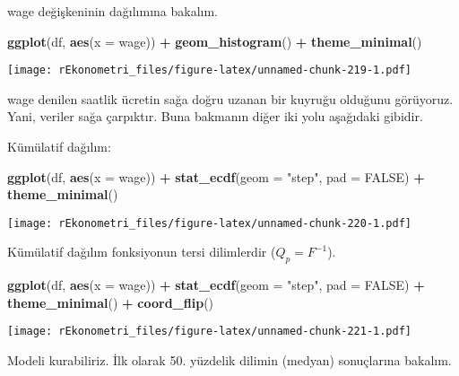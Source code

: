 \documentclass[
]{book}
\newenvironment{Shaded}{\begin{snugshade}}{\end{snugshade}}
\newcommand{\DataTypeTok}[1]{\textcolor[rgb]{0.13,0.29,0.53}{#1}}
\newcommand{\KeywordTok}[1]{\textcolor[rgb]{0.13,0.29,0.53}{\textbf{#1}}}
\newcommand{\NormalTok}[1]{#1}
\newcommand{\OperatorTok}[1]{\textcolor[rgb]{0.81,0.36,0.00}{\textbf{#1}}}
\newcommand{\OtherTok}[1]{\textcolor[rgb]{0.56,0.35,0.01}{#1}}
\newcommand{\StringTok}[1]{\textcolor[rgb]{0.31,0.60,0.02}{#1}}
\begin{document}
wage değişkeninin dağılımına bakalım.

\begin{Shaded}
\begin{Highlighting}[]
\KeywordTok{ggplot}\NormalTok{(df, }\KeywordTok{aes}\NormalTok{(}\DataTypeTok{x =}\NormalTok{ wage)) }\OperatorTok{+}
\StringTok{  }\KeywordTok{geom_histogram}\NormalTok{() }\OperatorTok{+}
\StringTok{  }\KeywordTok{theme_minimal}\NormalTok{()}
\end{Highlighting}
\end{Shaded}

\texttt{[image: rEkonometri\_files/figure-latex/unnamed-chunk-219-1.pdf]}

wage denilen saatlik ücretin sağa doğru uzanan bir kuyruğu olduğunu görüyoruz. Yani, veriler sağa çarpıktır. Buna bakmanın diğer iki yolu aşağıdaki gibidir.

Kümülatif dağılım:

\begin{Shaded}
\begin{Highlighting}[]
\KeywordTok{ggplot}\NormalTok{(df, }\KeywordTok{aes}\NormalTok{(}\DataTypeTok{x =}\NormalTok{ wage)) }\OperatorTok{+}
\StringTok{  }\KeywordTok{stat_ecdf}\NormalTok{(}\DataTypeTok{geom =} \StringTok{"step"}\NormalTok{, }\DataTypeTok{pad =} \OtherTok{FALSE}\NormalTok{) }\OperatorTok{+}
\StringTok{  }\KeywordTok{theme_minimal}\NormalTok{()}
\end{Highlighting}
\end{Shaded}

\texttt{[image: rEkonometri\_files/figure-latex/unnamed-chunk-220-1.pdf]}

Kümülatif dağılım fonksiyonun tersi dilimlerdir (\(Q_p = F^{-1}\)).

\begin{Shaded}
\begin{Highlighting}[]
\KeywordTok{ggplot}\NormalTok{(df, }\KeywordTok{aes}\NormalTok{(}\DataTypeTok{x =}\NormalTok{ wage)) }\OperatorTok{+}
\StringTok{  }\KeywordTok{stat_ecdf}\NormalTok{(}\DataTypeTok{geom =} \StringTok{"step"}\NormalTok{, }\DataTypeTok{pad =} \OtherTok{FALSE}\NormalTok{) }\OperatorTok{+}
\StringTok{  }\KeywordTok{theme_minimal}\NormalTok{() }\OperatorTok{+}
\StringTok{  }\KeywordTok{coord_flip}\NormalTok{()}
\end{Highlighting}
\end{Shaded}

\texttt{[image: rEkonometri\_files/figure-latex/unnamed-chunk-221-1.pdf]}

Modeli kurabiliriz. İlk olarak 50. yüzdelik dilimin (medyan) sonuçlarına bakalım.
\end{document}
